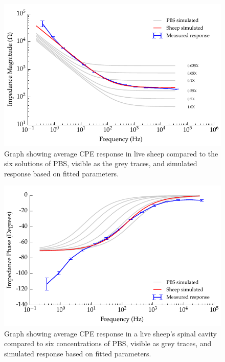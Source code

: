     \begin{figure}
      \centering
      \includegraphics{content/pt2/08-InterfaceParameters/graphics/graph_displacement-withSheep_impedanceVsFrequency_magnitude_thesis}
      \caption{\label{fig:graph_displacement-withSheep_impedanceVsFrequensy_magnitude} Graph showing average CPE response in live sheep compared to the six solutions of PBS, visible as the grey traces, and simulated response based on fitted parameters.}
    \end{figure}

    \begin{figure}
      \centering
      \includegraphics{content/pt2/08-InterfaceParameters/graphics/graph_displacement-withSheep_impedanceVsFrequency_phase_thesis}
      \caption{\label{fig:graph_displacement-withSheep_impedanceVsFrequency_phase} Graph showing average CPE response in a live sheep's spinal cavity compared to six concentrations of PBS, visible as grey traces, and simulated response based on fitted parameters.}
    \end{figure}


